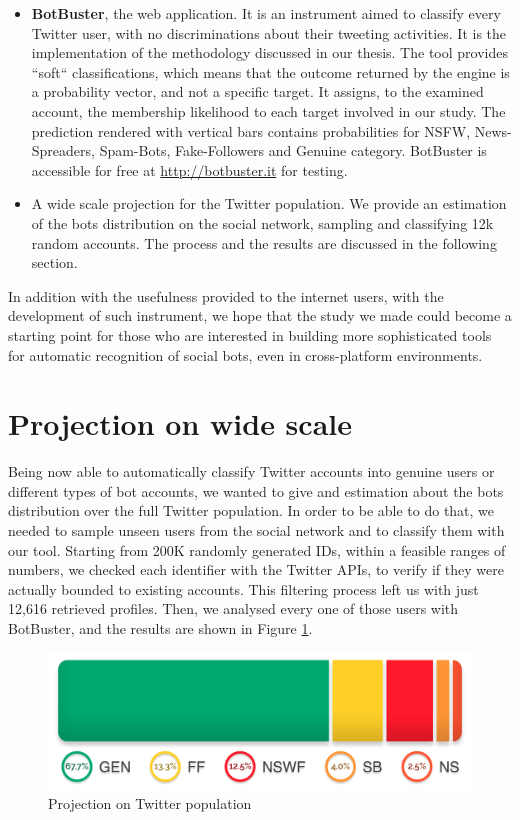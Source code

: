\begin{itemize}
	\item[\PencilRight] \textbf{BotBuster}, the web application. It is an instrument aimed to classify every Twitter user, with no discriminations about their tweeting activities. It is the implementation of the methodology discussed in our thesis. The tool provides ``soft`` classifications, which means that the outcome returned by the engine is a probability vector, and not a specific target. It assigns, to the examined account, the membership likelihood to each target involved in our study.
	The prediction rendered with vertical bars contains probabilities for NSFW, News-Spreaders, Spam-Bots, Fake-Followers and Genuine category.
	BotBuster is accessible for free at \url{http://botbuster.it} for testing.
	
	\item[\PencilRight] A wide scale projection for the Twitter population.
	We provide an estimation of the bots distribution on the social network, sampling and classifying 12k random accounts. The process and the results are discussed in the following section.
\end{itemize}

In addition with the usefulness provided to the internet users, with the development of such instrument, we hope that the study we made could become a starting point for those who are interested in building more sophisticated tools for automatic recognition of social bots, even in cross-platform environments.

\section{Projection on wide scale}
Being now able to automatically classify Twitter accounts into genuine users or different types of bot accounts, we wanted to give and estimation about the bots distribution over the full Twitter population. In order to be able to do that, we needed to sample unseen users from the social network and to classify them with our tool.
Starting from 200K randomly generated IDs, within a feasible ranges of numbers, we checked each identifier with the Twitter APIs, to verify if they were actually bounded to existing accounts.
This filtering process left us with just 12,616 retrieved profiles.
Then, we analysed every one of those users with BotBuster, and the results are shown in Figure \ref{fig:projection}.
\begin{figure}[htp!]
	\begin{center}
		\includegraphics[width=\columnwidth]{chapter8/figure/projection.png}
	\end{center}
	\caption{Projection on Twitter population}
	\label{fig:projection}
\end{figure}

